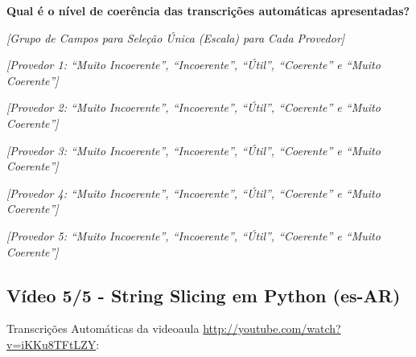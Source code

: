 \noindent
\textbf{Qual é o nível de coerência das transcrições automáticas apresentadas?}

\noindent
\textit{[Grupo de Campos para Seleção Única (Escala) para Cada Provedor]}

\noindent
\textit{[Provedor 1: ``Muito Incoerente'', ``Incoerente'', ``Útil'', ``Coerente'' e ``Muito Coerente'']}

\noindent
\textit{[Provedor 2: ``Muito Incoerente'', ``Incoerente'', ``Útil'', ``Coerente'' e ``Muito Coerente'']}

\noindent
\textit{[Provedor 3: ``Muito Incoerente'', ``Incoerente'', ``Útil'', ``Coerente'' e ``Muito Coerente'']}

\noindent
\textit{[Provedor 4: ``Muito Incoerente'', ``Incoerente'', ``Útil'', ``Coerente'' e ``Muito Coerente'']}

\noindent
\textit{[Provedor 5: ``Muito Incoerente'', ``Incoerente'', ``Útil'', ``Coerente'' e ``Muito Coerente'']}

\subsection{Vídeo 5/5 - String Slicing em Python (es-AR)}

\noindent
Transcrições Automáticas da videoaula \url{http://youtube.com/watch?v=iKKu8TFtLZY}:

